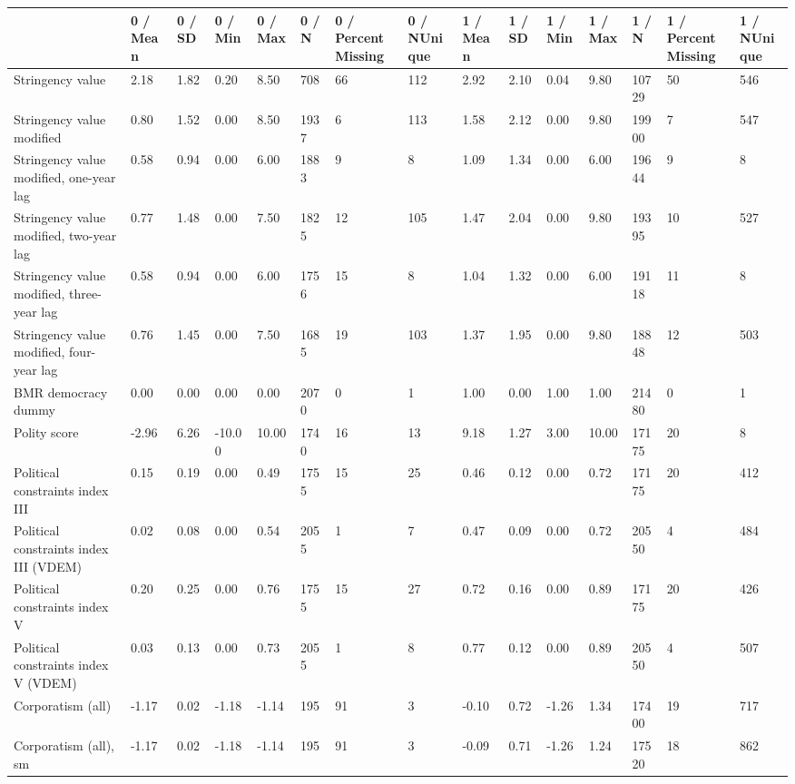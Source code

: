
\begin{longtable}{lllllllllllllll}
\toprule
  & 0 / Mean & 0 / SD & 0 / Min & 0 / Max & 0 / N & 0 / PercentMissing & 0 / NUnique & 1 / Mean & 1 / SD & 1 / Min & 1 / Max & 1 / N & 1 / PercentMissing & 1 / NUnique\\
\midrule
Stringency value & 2.18 & 1.82 & 0.20 & 8.50 & 708 & 66 & 112 & 2.92 & 2.10 & 0.04 & 9.80 & 10729 & 50 & 546\\
Stringency value modified & 0.80 & 1.52 & 0.00 & 8.50 & 1937 & 6 & 113 & 1.58 & 2.12 & 0.00 & 9.80 & 19900 & 7 & 547\\
Stringency value modified, one-year lag & 0.58 & 0.94 & 0.00 & 6.00 & 1883 & 9 & 8 & 1.09 & 1.34 & 0.00 & 6.00 & 19644 & 9 & 8\\
Stringency value modified, two-year lag & 0.77 & 1.48 & 0.00 & 7.50 & 1825 & 12 & 105 & 1.47 & 2.04 & 0.00 & 9.80 & 19395 & 10 & 527\\
Stringency value modified, three-year lag & 0.58 & 0.94 & 0.00 & 6.00 & 1756 & 15 & 8 & 1.04 & 1.32 & 0.00 & 6.00 & 19118 & 11 & 8\\
\addlinespace
Stringency value modified, four-year lag & 0.76 & 1.45 & 0.00 & 7.50 & 1685 & 19 & 103 & 1.37 & 1.95 & 0.00 & 9.80 & 18848 & 12 & 503\\
BMR democracy dummy & 0.00 & 0.00 & 0.00 & 0.00 & 2070 & 0 & 1 & 1.00 & 0.00 & 1.00 & 1.00 & 21480 & 0 & 1\\
Polity score & -2.96 & 6.26 & -10.00 & 10.00 & 1740 & 16 & 13 & 9.18 & 1.27 & 3.00 & 10.00 & 17175 & 20 & 8\\
Political constraints index III & 0.15 & 0.19 & 0.00 & 0.49 & 1755 & 15 & 25 & 0.46 & 0.12 & 0.00 & 0.72 & 17175 & 20 & 412\\
Political constraints index III (VDEM) & 0.02 & 0.08 & 0.00 & 0.54 & 2055 & 1 & 7 & 0.47 & 0.09 & 0.00 & 0.72 & 20550 & 4 & 484\\
\addlinespace
Political constraints index V & 0.20 & 0.25 & 0.00 & 0.76 & 1755 & 15 & 27 & 0.72 & 0.16 & 0.00 & 0.89 & 17175 & 20 & 426\\
Political constraints index V (VDEM) & 0.03 & 0.13 & 0.00 & 0.73 & 2055 & 1 & 8 & 0.77 & 0.12 & 0.00 & 0.89 & 20550 & 4 & 507\\
Corporatism (all) & -1.17 & 0.02 & -1.18 & -1.14 & 195 & 91 & 3 & -0.10 & 0.72 & -1.26 & 1.34 & 17400 & 19 & 717\\
Corporatism (all), sm & -1.17 & 0.02 & -1.18 & -1.14 & 195 & 91 & 3 & -0.09 & 0.71 & -1.26 & 1.24 & 17520 & 18 & 862\\

\end{longtable}
